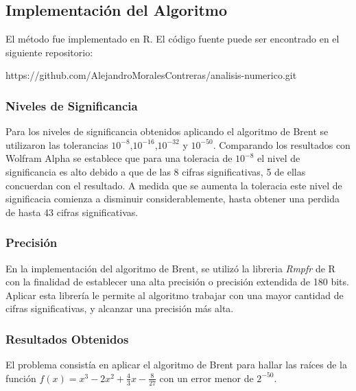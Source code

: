 \documentclass[a4paper,12pt]{article}
\begin{document}
\newpage

\subsection{Implementación del Algoritmo}

El método fue implementado en R. El código fuente puede ser encontrado en el siguiente repositorio: \par

\vspace{1em}
https://github.com/AlejandroMoralesContreras/analisis-numerico.git \par

\subsubsection{Niveles de Significancia}

Para los niveles de significancia obtenidos aplicando el algoritmo de Brent se utilizaron las tolerancias $10^{-8}$,$10^{-16}$,$10^{-32}$ y $10^{-50}$.
Comparando los resultados con Wolfram Alpha se establece que para una toleracia de $10^{-8}$ el nivel de significancia es alto debido a que de las 8 cifras significativas, 5 de ellas concuerdan con el resultado. A medida que se aumenta la toleracia este nivel de significacia comienza a disminuir considerablemente, hasta obtener una perdida de hasta 43 cifras significativas. \par

\subsubsection{Precisión}

En la implementación del algoritmo de Brent, se utilizó la libreria \textit{Rmpfr} de R con la finalidad de establecer una alta precisión o precisión extendida de 180 bits. Aplicar esta librería le permite al algoritmo trabajar con una mayor cantidad de cifras significativas, y alcanzar una precisión más alta. \par

\subsubsection{Resultados Obtenidos}

El problema consistía en aplicar el algoritmo de Brent para hallar las raíces de la función $f(x)=x^3-2x^2+\frac{4}{3}x-\frac{8}{27}$ con un error menor de $2^{-50}$. \par
\end{document}
